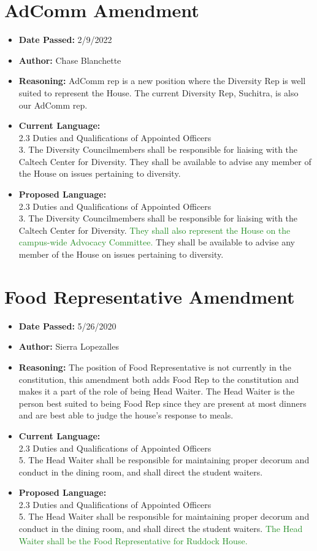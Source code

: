 \documentclass[10pt]{article} %
\begin{document}
\section{AdComm Amendment}
\begin{itemize}
	\item \textbf{Date Passed:} 2/9/2022
	\item \textbf{Author:} Chase Blanchette
	\item \textbf{Reasoning:} AdComm rep is a new position where the Diversity Rep is well suited to represent the House. The current Diversity Rep, Suchitra, is also our AdComm rep.
	\item \textbf{Current Language:} \\
	2.3 Duties and Qualifications of Appointed Officers \\
	3. The Diversity Councilmembers shall be responsible for liaising with the Caltech Center for Diversity. They shall be available to advise any member of the House on issues pertaining to diversity. 
	\item \textbf{Proposed Language:} \\
	2.3 Duties and Qualifications of Appointed Officers \\
	3. The Diversity Councilmembers shall be responsible for liaising with the Caltech Center for Diversity. \textcolor{ForestGreen}{They shall also represent the House on the campus-wide Advocacy Committee. }They shall be available to advise any member of the House on issues pertaining to diversity. 
\end{itemize}

\section{Food Representative Amendment}
\begin{itemize}
	\item \textbf{Date Passed:} 5/26/2020
	\item \textbf{Author:} Sierra Lopezalles
	\item \textbf{Reasoning:} The position of Food Representative is not currently in the constitution, this amendment both adds Food Rep to the constitution and makes it a part of the role of being Head Waiter. The Head Waiter is the person best suited to being Food Rep since they are present at most dinners and are best able to judge the house's response to meals.
	\item \textbf{Current Language:} \\
	2.3 Duties and Qualifications of Appointed Officers \\
	5. The Head Waiter shall be responsible for maintaining proper decorum and conduct in the dining room, and shall direct the student waiters.
	\item \textbf{Proposed Language:} \\
	2.3 Duties and Qualifications of Appointed Officers \\
	5. The Head Waiter shall be responsible for maintaining proper decorum and conduct in the dining room, and shall direct the student waiters. \textcolor{ForestGreen}{The Head Waiter shall be the Food Representative for Ruddock House.}
\end{itemize}
\end{document}
